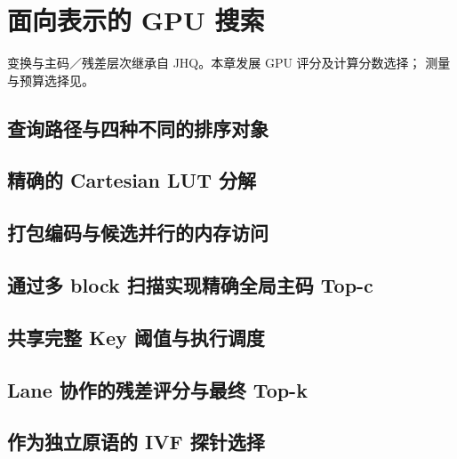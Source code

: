 \chapter{面向表示的 GPU 搜索}
\label{ch:gpu-execution}
变换与主码／残差层次继承自 JHQ\cite{jhq}。本章发展 GPU 评分及计算分数选择；
测量与预算选择见。

\section{查询路径与四种不同的排序对象}
\label{sec:5-1}


\section{精确的 Cartesian LUT 分解}
\label{sec:5-2}


\section{打包编码与候选并行的内存访问}
\label{sec:5-3}


\section{通过多 block 扫描实现精确全局主码 Top-c}
\label{sec:5-4}


\section{共享完整 Key 阈值与执行调度}
\label{sec:5-5}


\section{Lane 协作的残差评分与最终 Top-k}
\label{sec:5-6}


\section{作为独立原语的 IVF 探针选择}
\label{sec:5-7}

